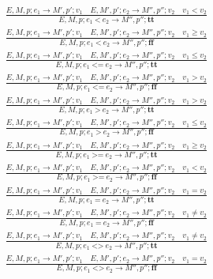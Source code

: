 \documentclass{article}
\newcommand{\btt}{\mathbf{tt}}
\newcommand{\bff}{\mathbf{ff}}
\begin{document}
\begin{align*}
\tag{\sc E-Less1}
\frac{E,M,p;e_1\rightarrow M',p';v_1 \quad E,M',p';e_2\rightarrow M'',p'';v_2 \quad v_1<v_2}
{E,M,p;e_1\ \texttt{<}\ e_2\rightarrow M'',p'';\btt}
\\
\tag{\sc E-Less2}
\frac{E,M,p;e_1\rightarrow M',p';v_1 \quad E,M',p';e_2\rightarrow M'',p'';v_2 \quad v_1\ge v_2}
{E,M,p;e_1\ \texttt{<}\ e_2\rightarrow M'',p'';\bff}
\\
\tag{\sc E-LessEq1}
\frac{E,M,p;e_1\rightarrow M',p';v_1 \quad E,M',p';e_2\rightarrow M'',p'';v_2 \quad v_1\le v_2}
{E,M,p;e_1\ \texttt{<=}\ e_2\rightarrow M'',p'';\btt}
\\
\tag{\sc E-LessEq2}
\frac{E,M,p;e_1\rightarrow M',p';v_1 \quad E,M',p';e_2\rightarrow M'',p'';v_2 \quad v_1>v_2}
{E,M,p;e_1\ \texttt{<=}\ e_2\rightarrow M'',p'';\bff}
\\
\tag{\sc E-Greater1}
\frac{E,M,p;e_1\rightarrow M',p';v_1 \quad E,M',p';e_2\rightarrow M'',p'';v_2 \quad v_1>v_2}
{E,M,p;e_1\ \texttt{>}\ e_2\rightarrow M'',p'';\btt}
\\
\tag{\sc E-Greater2}
\frac{E,M,p;e_1\rightarrow M',p';v_1 \quad E,M',p';e_2\rightarrow M'',p'';v_2 \quad v_1\le v_2}
{E,M,p;e_1\ \texttt{>}\ e_2\rightarrow M'',p'';\bff}
\\
\tag{\sc E-GreaterEq1}
\frac{E,M,p;e_1\rightarrow M',p';v_1 \quad E,M',p';e_2\rightarrow M'',p'';v_2 \quad v_1\ge v_2}
{E,M,p;e_1\ \texttt{>=}\ e_2\rightarrow M'',p'';\btt}
\\
\tag{\sc E-GreaterEq2}
\frac{E,M,p;e_1\rightarrow M',p';v_1 \quad E,M',p';e_2\rightarrow M'',p'';v_2 \quad v_1<v_2}
{E,M,p;e_1\ \texttt{>=}\ e_2\rightarrow M'',p'';\bff}
\\
\tag{\sc E-Eq1}
\frac{E,M,p;e_1\rightarrow M',p';v_1 \quad E,M',p';e_2\rightarrow M'',p'';v_2 \quad v_1=v_2}
{E,M,p;e_1\ \texttt{=}\ e_2\rightarrow M'',p'';\btt}
\\
\tag{\sc E-Eq2}
\frac{E,M,p;e_1\rightarrow M',p';v_1 \quad E,M',p';e_2\rightarrow M'',p'';v_2 \quad v_1\ne v_2}
{E,M,p;e_1\ \texttt{=}\ e_2\rightarrow M'',p'';\bff}
\\
\tag{\sc E-Neq1}
\frac{E,M,p;e_1\rightarrow M',p';v_1 \quad E,M',p';e_2\rightarrow M'',p'';v_2 \quad v_1\ne v_2}
{E,M,p;e_1\ \texttt{<>}\ e_2\rightarrow M'',p'';\btt}
\\
\tag{\sc E-Neq2}
\frac{E,M,p;e_1\rightarrow M',p';v_1 \quad E,M',p';e_2\rightarrow M'',p'';v_2 \quad v_1=v_2}
{E,M,p;e_1\ \texttt{<>}\ e_2\rightarrow M'',p'';\bff}
\end{align*}
\end{document}
